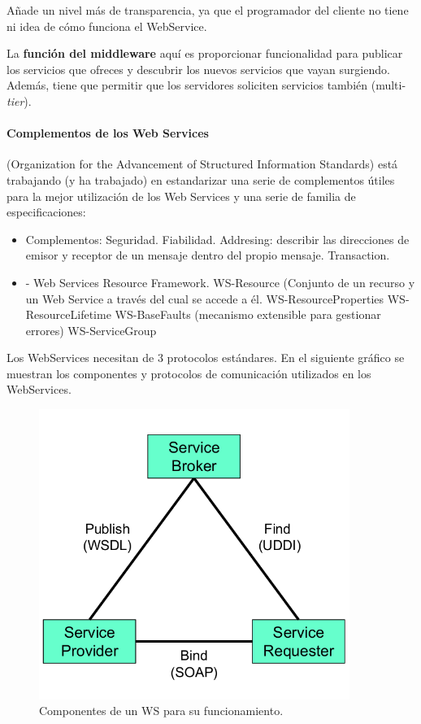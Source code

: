 Añade un nivel más de transparencia, ya que el programador del cliente no tiene ni idea de cómo funciona el WebService.

La \textbf{función del middleware} aquí es proporcionar funcionalidad para publicar los servicios que ofreces y descubrir los nuevos servicios que vayan surgiendo. Además, tiene que permitir que los servidores soliciten servicios también (multi-\textit{tier}).

\paragraph{Complementos de los Web Services}  (Organization for the Advancement of Structured Information Standards) está trabajando (y ha trabajado) en estandarizar una serie de complementos útiles para la mejor utilización de los Web Services y una serie de familia de especificaciones:
\begin{itemize}
\item Complementos:
	\subitem Seguridad.
	\subitem Fiabilidad.
	\subitem Addresing: describir las direcciones de emisor y receptor de un mensaje dentro del propio mensaje.
	\subitem Transaction.
\item {} - Web Services Resource Framework.
	\subitem WS-Resource (Conjunto de un recurso y un Web Service a través del cual se accede a él.
	\subitem WS-ResourceProperties
	\subitem WS-ResourceLifetime
	\subitem WS-BaseFaults (mecanismo extensible para gestionar errores)
	\subitem WS-ServiceGroup
\end{itemize}

Los WebServices necesitan de 3 protocolos estándares. En el siguiente gráfico se muestran los componentes y protocolos de comunicación utilizados en los WebServices.


\begin{figure}[htb]
\centering
\includegraphics[width=0.9\textwidth]{img/WS.png}
\caption{Componentes de un WS para su funcionamiento.}
\label{WSimg}
\end{figure}


